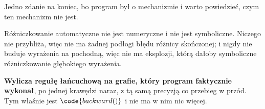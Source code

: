 \begin{fr}
Jedno zdanie na koniec, bo program był o mechanizmie i warto powiedzieć, czym
ten mechanizm nie jest.

Różniczkowanie automatyczne nie jest numeryczne i nie jest symboliczne. Niczego
nie przybliża, więc nie ma żadnej podłogi błędu różnicy skończonej; i nigdy nie
buduje wyrażenia na pochodną, więc nie ma eksplozji, którą dałoby symboliczne
różniczkowanie głębokiego wyrażenia.

\textbf{Wylicza regułę łańcuchową na grafie, który program faktycznie
wykonał}, po jednej krawędzi naraz, z tą samą precyzją co przebieg w przód. Tym
właśnie jest $\code{backward()}$ i nie ma w nim nic więcej.
\end{fr}

